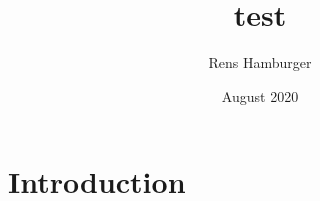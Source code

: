 \documentclass{article}
\title{test}
\author{Rens Hamburger}
\date{August 2020}
\begin{document}
\maketitle

\section{Introduction}
\end{document}
